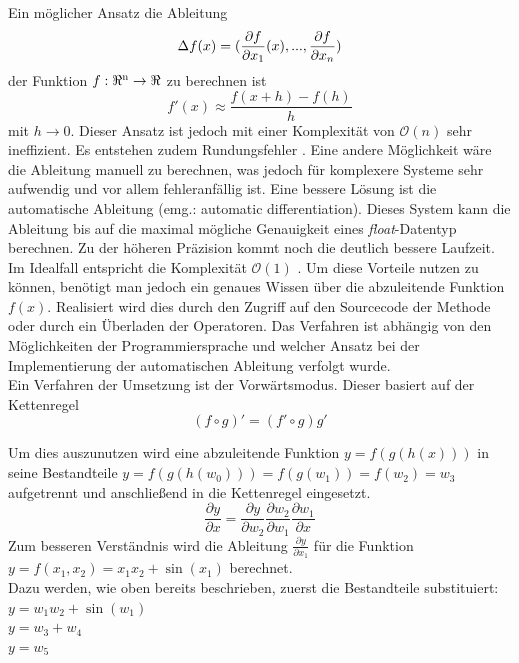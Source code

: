 \documentclass{like}
\begin{document}
Ein möglicher Ansatz die Ableitung 
\begin{equation}
	\Delta{\tiny } f(x) = (\frac{\partial f}{\partial x_1} (x), ..., \frac{\partial f}{\partial x_n})
\end{equation}
der Funktion $f:\Re \textsuperscript{n} \rightarrow \Re $ zu berechnen ist \\
\begin{equation}
	f'(x) \approx \frac{f(x+h) - f(h)}{h}
\end{equation}
 mit $ h \rightarrow 0$.
Dieser Ansatz ist jedoch mit einer Komplexität von $\mathcal{O}(n)$ sehr ineffizient. Es entstehen zudem Rundungsfehler \cite{julDiff}.
Eine andere Möglichkeit wäre die Ableitung manuell zu berechnen, was jedoch für komplexere Systeme sehr aufwendig und vor allem fehleranfällig ist. Eine bessere Lösung ist die automatische Ableitung (emg.: automatic differentiation). 
Dieses System kann die Ableitung bis auf die maximal mögliche Genauigkeit eines \textit{float}-Datentyp berechnen. Zu der höheren Präzision kommt noch die deutlich bessere Laufzeit. Im Idealfall entspricht die Komplexität $\mathcal{O}(1)$ \cite{julDiff}. Um diese Vorteile nutzen zu können, benötigt man jedoch ein genaues Wissen über die abzuleitende Funktion \(f(x)\). Realisiert wird dies durch den Zugriff auf den Sourcecode der Methode oder durch ein Überladen der Operatoren. Das Verfahren ist abhängig von den Möglichkeiten der Programmiersprache und welcher Ansatz bei der Implementierung der automatischen Ableitung verfolgt wurde. \\

Ein Verfahren der Umsetzung ist der Vorwärtsmodus. Dieser basiert auf der Kettenregel 
\begin{equation}
	(f \circ g)' = (f' \circ g)g'
\end{equation}

Um dies auszunutzen wird eine abzuleitende Funktion $ y = f(g(h(x)))$ in seine Bestandteile $y = f(g(h(w_0))) = f(g(w_1)) = f(w_2) = w_3$ aufgetrennt und anschließend in die Kettenregel eingesetzt. 
\begin{equation}
\frac{\partial y}{\partial x} = \frac{\partial y}{\partial w_2} \frac{\partial w_2}{\partial w_1} \frac{\partial w_1}{\partial x}
\end{equation}
Zum besseren Verständnis wird die Ableitung $\frac{\partial y}{\partial x_1}$ für die Funktion
$y = f(x_1, x_2) = x_1x_2 + \sin(x_1)$  berechnet.\\
Dazu werden, wie oben bereits beschrieben, zuerst die Bestandteile substituiert:\\
$y = w_1w_2 + \sin(w_1) $ \\
$y = w_3 + w_4$ \\
$y = w_5$
\end{document}
